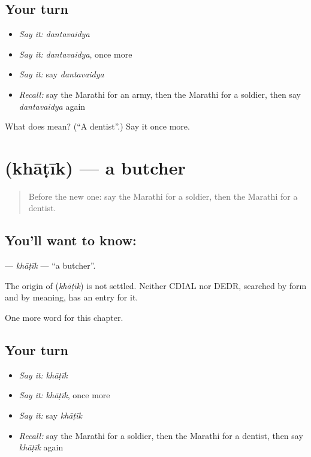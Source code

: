 \subsection*{Your turn}
\begin{itemize}
\raggedright
  \item \emph{Say it:} \emph{dantavaidya}
  \item \emph{Say it:} \emph{dantavaidya}, once more
  \item \emph{Say it:} say \emph{dantavaidya}
  \item \emph{Recall:} say the Marathi for an army, then the Marathi for a soldier, then say \emph{dantavaidya} again
\end{itemize}

\begin{tcolorbox}[breakable,colback=teal!4,colframe=teal!35!black,title={Before you move on}]
What does  mean? (\textquotedblleft{}A dentist\textquotedblright{}.) Say it once more.
\end{tcolorbox}
\section[\texorpdfstring{\mr{खाटीक} (khāṭīk)}{खाटीक (khāṭīk)}]{ (khāṭīk) — a butcher}

\label{lesson:MR-C210-khatik}



\begin{quote}
Before the new one: say the Marathi for a soldier, then the Marathi for a dentist.
\end{quote}

\subsection*{You'll want to know: }
\textbf{} — \emph{khāṭīk} — \textquotedblleft{}a butcher\textquotedblright{}.

\begin{cousinweb}
The origin of \textbf{} (\emph{khāṭīk}) is not settled. Neither CDIAL nor DEDR, searched by form and by meaning, has an entry for it.
\end{cousinweb}

\begin{grammarlens}[title={What you've built}]
One more word for this chapter.
\end{grammarlens}

\subsection*{Your turn}
\begin{itemize}
\raggedright
  \item \emph{Say it:} \emph{khāṭīk}
  \item \emph{Say it:} \emph{khāṭīk}, once more
  \item \emph{Say it:} say \emph{khāṭīk}
  \item \emph{Recall:} say the Marathi for a soldier, then the Marathi for a dentist, then say \emph{khāṭīk} again
\end{itemize}

